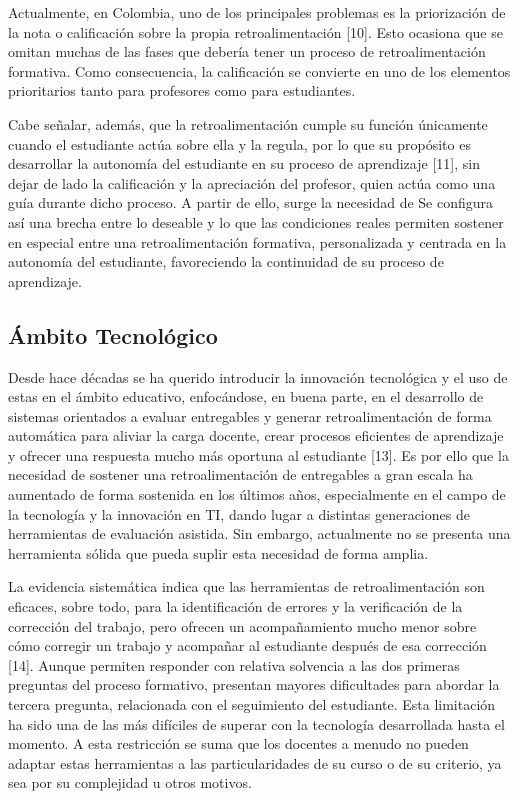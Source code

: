 \documentclass[letterpaper, 10 pt, conference]{ieeeconf}  %
\begin{document}
    Actualmente, en Colombia, uno de los principales problemas es la priorización de la nota o calificación sobre la propia retroalimentación [10]. Esto ocasiona que se omitan muchas de las fases que debería tener un proceso de retroalimentación formativa. Como consecuencia, la calificación se convierte en uno de los elementos prioritarios tanto para profesores como para estudiantes.

    Cabe señalar, además, que la retroalimentación cumple su función únicamente cuando el estudiante actúa sobre ella y la regula, por lo que su propósito es desarrollar la autonomía del estudiante en su proceso de aprendizaje [11], sin dejar de lado la calificación y la apreciación del profesor, quien actúa como una guía durante dicho proceso. A partir de ello, surge la necesidad de Se configura así una brecha entre lo deseable y lo que las condiciones reales permiten sostener en especial entre una retroalimentación formativa, personalizada y centrada en la autonomía del estudiante, favoreciendo la continuidad de su proceso de aprendizaje. 
    
    
    \subsection{Ámbito Tecnológico} 
    Desde hace décadas se ha querido introducir la innovación tecnológica y el uso de estas en el ámbito educativo, enfocándose, en buena parte, en el desarrollo de sistemas orientados a evaluar entregables y generar retroalimentación de forma automática para aliviar la carga docente, crear procesos eficientes de aprendizaje y ofrecer una respuesta mucho más oportuna al estudiante [13]. Es por ello que la necesidad de sostener una retroalimentación de entregables a gran escala ha aumentado de forma sostenida en los últimos años, especialmente en el campo de la tecnología y la innovación en TI, dando lugar a distintas generaciones de herramientas de evaluación asistida. Sin embargo, actualmente no se presenta una herramienta sólida que pueda suplir esta necesidad de forma amplia.

    La evidencia sistemática indica que las herramientas de retroalimentación son eficaces, sobre todo, para la identificación de errores y la verificación de la corrección del trabajo, pero ofrecen un acompañamiento mucho menor sobre cómo corregir un trabajo y acompañar al estudiante después de esa corrección [14]. Aunque permiten responder con relativa solvencia a las dos primeras preguntas del proceso formativo, presentan mayores dificultades para abordar la tercera pregunta, relacionada con el seguimiento del estudiante. Esta limitación ha sido una de las más difíciles de superar con la tecnología desarrollada hasta el momento. A esta restricción se suma que los docentes a menudo no pueden adaptar estas herramientas a las particularidades de su curso o de su criterio, ya sea por su complejidad u otros motivos.
\end{document}
